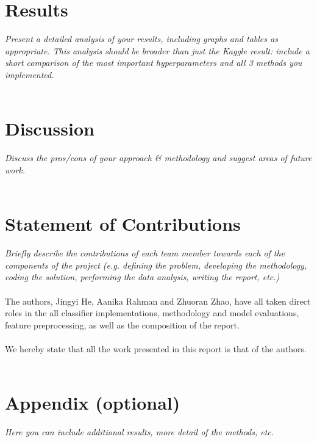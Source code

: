 \documentclass[conference]{IEEEtran}
\begin{document}
\section{Results}
\emph{Present a detailed analysis of your results, including graphs and tables as appropriate. This analysis should be broader than just the Kaggle result: include a short comparison of the most important hyperparameters and all 3 methods you implemented.}
\\
\\

\section{Discussion} 
\emph{Discuss the pros/cons of your approach \& methodology and suggest areas of future work.}
\\
\\

\section{Statement of Contributions} \emph{Briefly describe the contributions of each team member towards each of the components of the project (e.g. defining the problem, developing the methodology, coding the solution, performing the data analysis, writing the report, etc.)}
\\
\\ The authors, Jingyi He, Aanika Rahman and Zhuoran Zhao, have all taken direct roles in the all classifier implementations, methodology and model evaluations, feature preprocessing, as well as the composition of the report. 
\\
\\ We hereby state that all the work presented in this report is that of the authors.
\\
\\

\section*{Appendix (optional)} 
\emph{Here you can include additional results, more detail of the methods, etc.}
\\
\\



\end{document}
